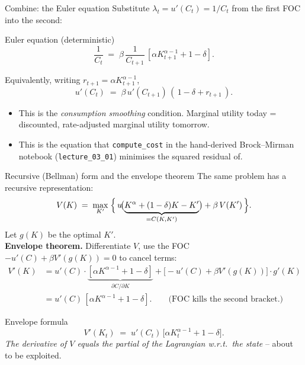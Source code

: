 \documentclass[aspectratio=169,11pt]{beamer}
\begin{document}
\begin{frame}{Combine: the Euler equation}
\small Substitute $\lambda_t = u'(C_t) = 1/C_t$ from the first FOC into the second:
\begin{block}{Euler equation (deterministic)}
\[
\frac{1}{C_t} \;=\; \beta\,\frac{1}{C_{t+1}}\,\left[\alpha K_{t+1}^{\alpha-1} + 1 - \delta\right].
\]
\end{block}
\vspace{6pt}
Equivalently, writing $r_{t+1} = \alpha K_{t+1}^{\alpha-1}$,
\[
u'(C_t) \;=\; \beta\, u'(C_{t+1}) \,(\,1 - \delta + r_{t+1}\,).
\]
\vspace{2pt}
\begin{itemize}\itemsep2pt
\item This is the \emph{consumption smoothing} condition. Marginal utility today = discounted, rate-adjusted marginal utility tomorrow.
\item This is the equation that \texttt{compute\_cost} in the hand-derived Brock--Mirman notebook (\texttt{lecture\_03\_01}) minimises the squared residual of.
\end{itemize}
\end{frame}

\begin{frame}{Recursive (Bellman) form and the envelope theorem}
\footnotesize The same problem has a recursive representation:
\[
V(K) \;=\; \max_{K'}\; \Bigl\{\, u\!\bigl(\underbrace{K^\alpha + (1-\delta)K - K'}_{= C(K,K')}\bigr) + \beta\, V(K') \,\Bigr\}.
\]
Let $g(K)$ be the optimal $K'$.\\[2pt]
\textbf{Envelope theorem.} Differentiate $V$, use the FOC $-u'(C) + \beta V'(g(K)) = 0$ to cancel terms:
\begin{align*}
V'(K) &= u'\!(C)\cdot\underbrace{[\alpha K^{\alpha-1} + 1 - \delta]}_{\partial C / \partial K} + \bigl[-u'(C) + \beta V'(g(K))\bigr]\cdot g'(K)\\
&= u'(C)\,[\alpha K^{\alpha-1} + 1 - \delta]. \qquad\text{(FOC kills the second bracket.)}
\end{align*}
\begin{alertblock}{Envelope formula}
\footnotesize
\[
V'(K_t) \;=\; u'(C_t)\,\bigl[\alpha K_t^{\alpha-1} + 1 - \delta\bigr].
\]
\emph{The derivative of $V$ equals the partial of the Lagrangian w.r.t.\ the state} -- about to be exploited.
\end{alertblock}
\end{frame}
\end{document}
